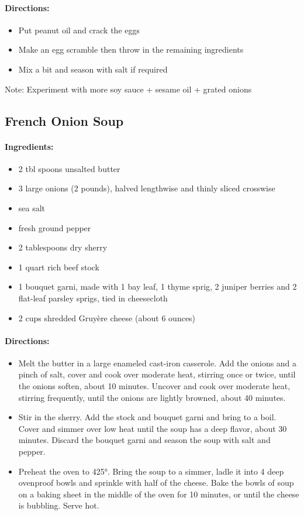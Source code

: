 \documentclass{article}
\begin{document}
\paragraph{Directions:}
\begin{itemize}
	\item Put peanut oil and crack the eggs
	\item Make an egg scramble then throw in the remaining ingredients
	\item Mix a bit and season with salt if required
	
\end{itemize}

Note: Experiment with more soy sauce + sesame oil + grated onions

\subsection{French Onion Soup}

\paragraph{Ingredients:}

\begin{itemize}
	\item 2 tbl spoons unsalted butter
	\item 3 large onions (2 pounds), halved lengthwise and thinly sliced crosswise
	\item sea salt
	\item fresh ground pepper
	\item 2 tablespoons dry sherry
	\item 1 quart rich beef stock
	\item 1 bouquet garni, made with 1 bay leaf, 1 thyme sprig, 2 juniper berries and 2 flat-leaf parsley sprigs, tied in cheesecloth
	\item 2 cups shredded Gruyère cheese (about 6 ounces)
\end{itemize}

\paragraph{Directions:}
\begin{itemize}
	\item Melt the butter in a large enameled cast-iron casserole. Add the onions and a pinch of salt, cover and cook over moderate heat, stirring once or twice, until the onions soften, about 10 minutes. Uncover and cook over moderate heat, stirring frequently, until the onions are lightly browned, about 40 minutes.
	\item Stir in the sherry. Add the stock and bouquet garni and bring to a boil. Cover and simmer over low heat until the soup has a deep flavor, about 30 minutes. Discard the bouquet garni and season the soup with salt and pepper.
	\item Preheat the oven to 425°. Bring the soup to a simmer, ladle it into 4 deep ovenproof bowls and sprinkle with half of the cheese. Bake the bowls of soup on a baking sheet in the middle of the oven for 10 minutes, or until the cheese is bubbling. Serve hot.
\end{itemize}
\end{document}
